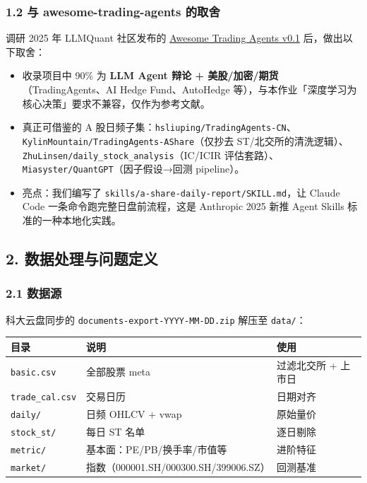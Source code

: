 \documentclass[
  fontset=fandol]{ctexart}
\providecommand{\tightlist}{%
  \setlength{\itemsep}{0pt}\setlength{\parskip}{0pt}}
\begin{document}
\hypertarget{ux4e0e-awesome-trading-agents-ux7684ux53d6ux820d}{%
\subsubsection{1.2 与
awesome-trading-agents
的取舍}\label{ux4e0e-awesome-trading-agents-ux7684ux53d6ux820d}}

调研 2025 年 LLMQuant 社区发布的
\href{https://github.com/LLMQuant/awesome-trading-agents}{Awesome
Trading Agents v0.1} 后，做出以下取舍：

\begin{itemize}
\tightlist
\item
  收录项目中 90\% 为 \textbf{LLM Agent
  辩论 +
  美股/加密/期货}（TradingAgents、AI
  Hedge Fund、AutoHedge
  等），与本作业「深度学习为核心决策」要求不兼容，仅作为参考文献。
\item
  真正可借鉴的 A
  股日频子集：\texttt{hsliuping/TradingAgents-CN}、\texttt{KylinMountain/TradingAgents-AShare}（仅抄去
  ST/北交所的清洗逻辑）、\texttt{ZhuLinsen/daily\_stock\_analysis}（IC/ICIR
  评估套路）、\texttt{Miasyster/QuantGPT}（因子假设→回测
  pipeline）。
\item
  亮点：我们编写了
  \texttt{skills/a-share-daily-report/SKILL.md}，让
  Claude Code
  一条命令跑完整日盘前流程，这是
  Anthropic 2025 新推 Agent Skills
  标准的一种本地化实践。
\end{itemize}

\hypertarget{ux6570ux636eux5904ux7406ux4e0eux95eeux9898ux5b9aux4e49}{%
\subsection{2.
数据处理与问题定义}\label{ux6570ux636eux5904ux7406ux4e0eux95eeux9898ux5b9aux4e49}}

\hypertarget{ux6570ux636eux6e90}{%
\subsubsection{2.1
数据源}\label{ux6570ux636eux6e90}}

科大云盘同步的
\texttt{documents-export-YYYY-MM-DD.zip}
解压至 \texttt{data/}：

\begin{longtable}[]{@{}
  >{\raggedright\arraybackslash}p{}
  >{\raggedright\arraybackslash}p{}
  >{\raggedright\arraybackslash}p{}@{}}
\toprule
目录 & 说明 & 使用 \\
\midrule
\endhead
\texttt{basic.csv} & 全部股票 meta &
过滤北交所 + 上市日 \\
\texttt{trade\_cal.csv} & 交易日历 &
日期对齐 \\
\texttt{daily/} & 日频 OHLCV + vwap &
原始量价 \\
\texttt{stock\_st/} & 每日 ST 名单 &
逐日剔除 \\
\texttt{metric/} &
基本面：PE/PB/换手率/市值等 &
进阶特征 \\
\texttt{market/} &
指数（000001.SH/000300.SH/399006.SZ） &
回测基准 \\
\bottomrule
\end{longtable}
\end{document}
